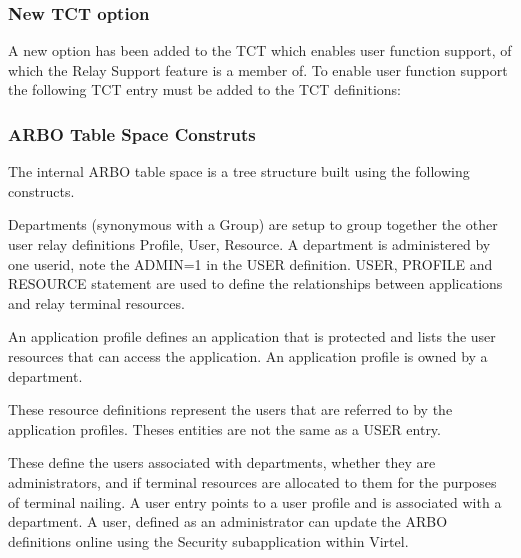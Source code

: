 \documentclass[letterpaper,10pt,english]{sphinxmanual}
\begin{document}
\subsubsection{New TCT option}
\label{\detokenize{connectivity_guide:new-tct-option}}
\sphinxAtStartPar
A new option has been added to the TCT which enables user function support, of which the Relay Support feature is a member of. To enable user function support the following TCT entry must be added to the TCT definitions: \sphinxhyphen{}

\begin{sphinxVerbatim}[commandchars=\\\{\}]
                 
\end{sphinxVerbatim}


\subsubsection{ARBO Table Space Construts}
\label{\detokenize{connectivity_guide:arbo-table-space-construts}}
\sphinxAtStartPar
The internal ARBO table space is a tree structure built using the following constructs.

\sphinxAtStartPar
{}
Departments (synonymous with a Group) are setup to group together the other user relay definitions \textendash{} Profile, User, Resource. A department is administered by one userid, note the ADMIN=1 in the USER definition. USER, PROFILE and RESOURCE statement are used to define the relationships between applications and relay terminal resources.

\sphinxAtStartPar
{}
An application profile defines an application that is protected and lists the user resources that can access the application. An application profile is owned by a department.

\sphinxAtStartPar
{}
These resource definitions represent the users that are referred to by the application profiles. Theses entities are not the same as a USER entry.

\sphinxAtStartPar
{}
These define the users associated with departments, whether they are administrators, and if terminal resources are allocated to them for the purposes of terminal nailing. A user entry points to a user profile and is associated with a department. A user, defined as an administrator can update the ARBO definitions online using the Security sub\sphinxhyphen{}application within Virtel.
\end{document}
